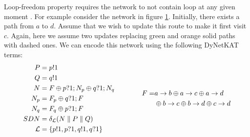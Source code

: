 \begin{example}
    \begin{figure}
        \centering
        \caption{ }
        \label{fig:loop}
    \end{figure}
    Loop-freedom property requires the network to not contain loop
    at any given moment \cite{network-abstractions}.
    For example consider the network in figure \ref{fig:loop}.
    Initially, there exists a path from $a$ to $d$.
    Assume that we wish to update this route to make it first visit
    $c$.
    Again, here we assume two updates replacing green and orange solid
    paths with dashed ones.
    We can encode this network using the following DyNetKAT terms:
    \begin{equation*}
        \begin{aligned}
            P           & = p!1                                             \\
            Q           & = q!1                                             \\
            N           & = F \oplus p?1;N_p \oplus q?1;N_q                 \\
            N_p         & = F_p \oplus q?1;F                                \\
            N_q         & = F_q \oplus p?1;F                                \\
            SDN         & = \delta_{\mathcal{L}}(N \parallel P \parallel Q) \\
            \mathcal{L} & = \s{p!1,p?1,q!1,q?1}
        \end{aligned}
        \qquad \qquad
        \begin{aligned}
            F    = & a\ra b \oplus a\ra c \oplus a\ra d               \\
                   & \oplus b\ra c \oplus b\ra d \oplus c\ra d        \\

\end{aligned}
\end{equation*}
\end{example}
